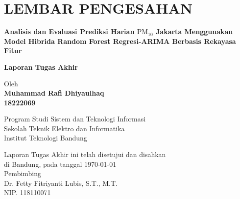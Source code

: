 \chapter*{LEMBAR PENGESAHAN}


\begin{center}
    \vspace{2cm}
  {\large\bfseries Analisis dan Evaluasi Prediksi Harian $\text{PM}_{10}$ Jakarta Menggunakan Model Hibrida Random Forest Regresi-ARIMA Berbasis Rekayasa Fitur}\\
     \vspace{2cm}

  {\Large \textbf{Laporan Tugas Akhir}}\\


  \vspace{1.5cm}
    
    
  {\large Oleh}\\[0.3cm]
    \textbf{
    {\large Muhammad Rafi Dhiyaulhaq}\\
    {\large 18222069}
  }\\
    
  \vspace{0.5cm}
 
  {\large Program Studi Sistem dan Teknologi Informasi}\\
  {\large Sekolah Teknik Elektro dan Informatika}\\
  {\large Institut Teknologi Bandung}\\

  \vspace{1.5cm}

  Laporan Tugas Akhir ini telah disetujui dan disahkan\\ 
  di Bandung, pada tanggal \today\\[1cm]

	Pembimbing  \\[3cm]
	Dr. Fetty Fitriyanti Lubis, S.T., M.T.   \\[0.2cm]
	NIP. 118110071 

\end{center}

\vspace{1cm}
\noindent




